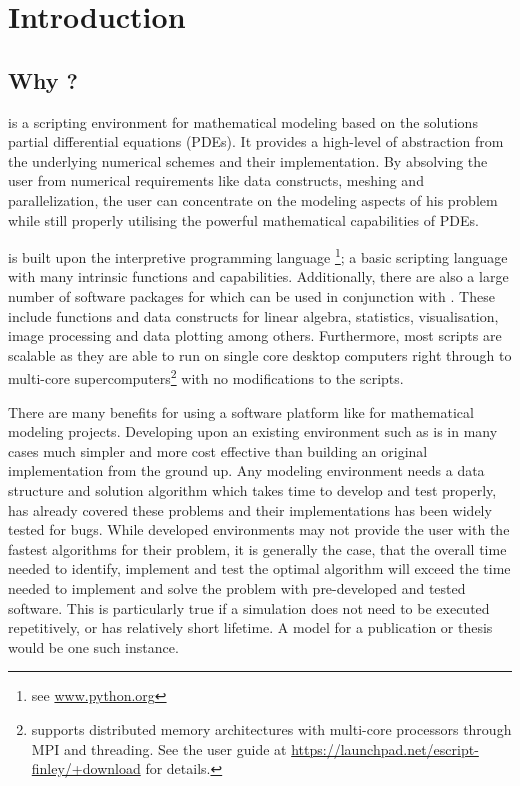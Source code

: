 
%
%
%

\chapter{Introduction}
\label{CHAP INTRO}
\section{Why \esc?}
\esc is a scripting environment for mathematical modeling based on the solutions partial differential equations (PDEs). It provides a high-level of abstraction from the underlying numerical schemes and their implementation. By absolving the user from numerical requirements like data constructs, meshing and parallelization, the user can concentrate on the modeling aspects of his problem while still properly utilising the powerful mathematical capabilities of PDEs. 

\esc is built upon the interpretive programming language \pyt\footnote{see \url{www.python.org}}; a basic scripting language with many intrinsic functions and capabilities. Additionally, there are also a large number of software packages for \pyt which can be used in conjunction with \esc. These include functions and data constructs for linear algebra, statistics, visualisation, image processing and data plotting among others. Furthermore, most \esc scripts are scalable as they are able to run on single core desktop computers right through to multi-core supercomputers\footnote{\esc supports distributed memory architectures with multi-core processors through MPI and threading. See the \esc user guide at \url{https://launchpad.net/escript-finley/+download} for details.} with no modifications to the scripts. 

There are many benefits for using a software platform like \esc for mathematical modeling projects. Developing upon an existing environment such as \esc is in many cases much simpler and more cost effective than building an original implementation from the ground up. Any modeling environment needs a data structure and solution algorithm which takes time to develop and test properly, \esc has already covered these problems and their implementations has been widely tested for bugs. While developed environments may not provide the user with the fastest algorithms for their problem, it is generally the case, that the overall time needed to identify, implement and test the optimal algorithm will exceed the time needed to implement and solve the problem with pre-developed and tested software. This is particularly true if a simulation does not need to be executed repetitively, or has relatively short lifetime. A model for a publication or thesis would be one such instance. 


